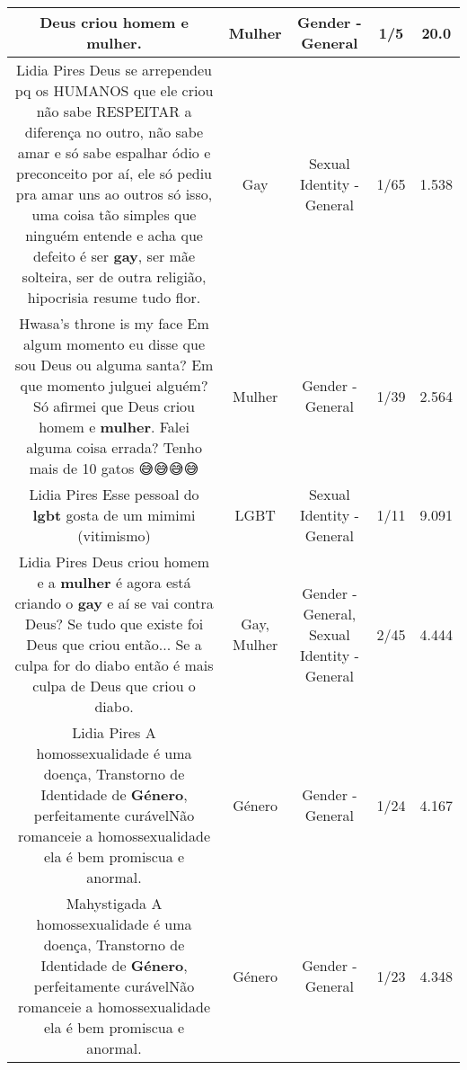 \documentclass[11pt]{article}
\newlength\mylength
\begin{document}
\begin{center}
\begin{longtable}{|C{.65\mylength}|C{.30\mylength}|C{.12\mylength}|C{.12\mylength}|C{.12\mylength}|}
  \small Deus criou homem e \textbf{mulher}.\normalsize   & Mulher & Gender - General & 1/5 & 20.0 \\  \hline
  \small Lidia Pires Deus se arrependeu pq os HUMANOS que ele criou não sabe RESPEITAR a diferença no outro, não sabe amar e só sabe espalhar ódio e preconceito por aí, ele só pediu pra amar uns ao outros só isso, uma coisa tão simples que ninguém entende e acha que defeito é ser \textbf{gay}, ser mãe solteira, ser de outra religião, hipocrisia resume tudo flor.\normalsize   & Gay & Sexual Identity - General & 1/65 & 1.538 \\  \hline
  \small Hwasa's throne is my face Em algum momento eu disse que sou Deus ou alguma santa?  Em que momento julguei alguém?  Só afirmei que Deus criou homem e \textbf{mulher}. Falei alguma coisa errada? Tenho mais de 10 gatos 😅😅😅😅\normalsize   & Mulher & Gender - General & 1/39 & 2.564 \\  \hline
  \small Lidia Pires Esse pessoal do \textbf{lgbt} gosta de um mimimi (vitimismo)\normalsize   & LGBT & Sexual Identity - General & 1/11 & 9.091 \\  \hline
  \small Lidia Pires Deus criou homem e a \textbf{mulher} é agora está criando o \textbf{gay} e aí se vai contra Deus? Se tudo que existe foi Deus que criou então...  Se a culpa for do diabo então é mais culpa de Deus que criou o diabo.\normalsize   & Gay, Mulher & Gender - General, Sexual Identity - General & 2/45 & 4.444 \\  \hline
  \small Lidia Pires A  homossexualidade é uma doença, Transtorno de Identidade de \textbf{Género}, perfeitamente curávelNão romanceie a homossexualidade ela é bem promiscua e anormal.\normalsize   & Género & Gender - General & 1/24 & 4.167 \\  \hline
  \small Mahystigada A  homossexualidade é uma doença, Transtorno de Identidade de \textbf{Género}, perfeitamente curávelNão romanceie a homossexualidade ela é bem promiscua e anormal.\normalsize   & Género & Gender - General & 1/23 & 4.348 \\  \hline

\end{longtable}
\end{center}
\end{document}
